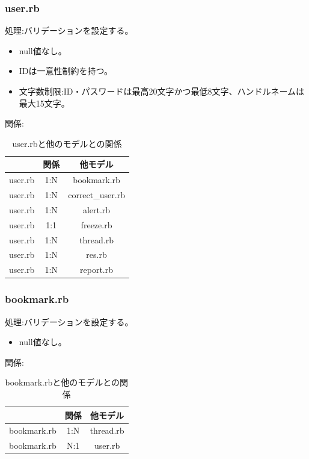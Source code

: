 \documentclass[a4j]{jarticle}
\begin{document}
\subsubsection{user.rb}
  \noindent
  処理:バリデーションを設定する。
  \begin{itemize}
    \item null値なし。
    \item IDは一意性制約を持つ。
    \item 文字数制限:ID・パスワードは最高20文字かつ最低8文字、ハンドルネームは最大15文字。
  \end{itemize}
  関係:
  \begin{table}[H]
    \centering
    \caption{user.rbと他のモデルとの関係}
    \begin{tabular}{|c|c|c|}\hline
      & 関係 & 他モデル\\ \hline \hline
      user.rb & 1:N & bookmark.rb \\ \hline
      user.rb & 1:N & correct\_user.rb \\ \hline
      user.rb & 1:N & alert.rb \\ \hline
      user.rb & 1:1 & freeze.rb \\ \hline
      user.rb & 1:N & thread.rb \\ \hline
      user.rb & 1:N & res.rb \\ \hline
      user.rb & 1:N & report.rb \\ \hline
    \end{tabular}
  \end{table}

\subsubsection{bookmark.rb}
\noindent
処理:バリデーションを設定する。
\begin{itemize}
  \item null値なし。
\end{itemize}
関係:
\begin{table}[H]
  \centering
  \caption{bookmark.rbと他のモデルとの関係}
  \begin{tabular}{|c|c|c|}\hline
    & 関係 & 他モデル\\ \hline \hline
    bookmark.rb & 1:N & thread.rb \\ \hline
    bookmark.rb & N:1 & user.rb \\ \hline
  \end{tabular}
\end{table}
\end{document}
